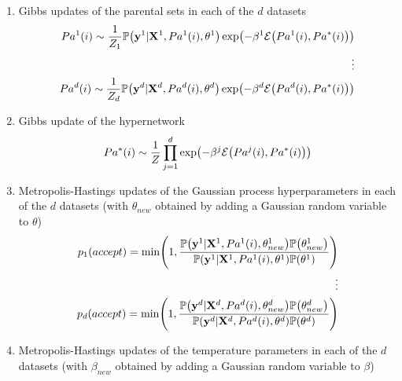 \documentclass{article}
\let\originalleft\left
\let\originalright\right
\renewcommand{\left}{\mathopen{}\mathclose\bgroup\originalleft}
\renewcommand{\right}{\aftergroup\egroup\originalright}
\begin{document}
\begin{enumerate}
\item Gibbs updates of the parental sets in each of the $d$ datasets
\begin{equation*}
\begin{split}
Pa^1\left(i\right) \sim \frac{1}{Z_{1}}\mathbb{P}\left(\mathbf{y}^1|\mathbf{X}^1,Pa^1\left(i\right),\theta^1\right)\exp\left( -\beta^1\mathcal{E}\left(Pa^1\left(i\right),Pa^*\left(i\right)\right) \right) \\
\vdots \\
Pa^d\left(i\right) \sim \frac{1}{Z_{d}}\mathbb{P}\left(\mathbf{y}^d|\mathbf{X}^d,Pa^d\left(i\right),\theta^d\right)\exp\left( -\beta^d\mathcal{E}\left(Pa^d\left(i\right),Pa^*\left(i\right)\right) \right)
\end{split}
\end{equation*}
\item Gibbs update of the hypernetwork
\begin{equation*}
Pa^*\left(i\right) \sim \frac{1}{Z}\prod_{j=1}^{d}\exp\left(-\beta^j\mathcal{E}\left(Pa^j\left(i\right),Pa^*\left(i\right)\right) \right)
\end{equation*}
\item Metropolis-Hastings updates of the Gaussian process hyperparameters in each of the $d$ datasets (with $\theta_{new}$ obtained by adding a Gaussian random variable to $\theta$)
\begin{equation*}
\begin{split}
p_1\left(accept\right) = \min\left(1,\frac{\mathbb{P}\left(\mathbf{y}^1|\mathbf{X}^1,Pa^1\left(i\right),\theta_{new}^1\right)\mathbb{P}\left(\theta_{new}^1\right)}{\mathbb{P}\left(\mathbf{y}^1|\mathbf{X}^1,Pa^1\left(i\right),\theta^1\right)\mathbb{P}\left(\theta^1\right)}\right) \\
\vdots \\
p_d\left(accept\right) = \min\left(1,\frac{\mathbb{P}\left(\mathbf{y}^d|\mathbf{X}^d,Pa^d\left(i\right),\theta_{new}^d\right)\mathbb{P}\left(\theta_{new}^d\right)}{\mathbb{P}\left(\mathbf{y}^d|\mathbf{X}^d,Pa^d\left(i\right),\theta^d\right)\mathbb{P}\left(\theta^d\right)}\right)
\end{split}
\end{equation*}
\item Metropolis-Hastings updates of the temperature parameters in each of the $d$ datasets (with $\beta_{new}$ obtained by adding a Gaussian random variable to $\beta$)
\begin{equation*}
\begin{split}

\end{split}
\end{equation*}
\end{enumerate}
\end{document}
